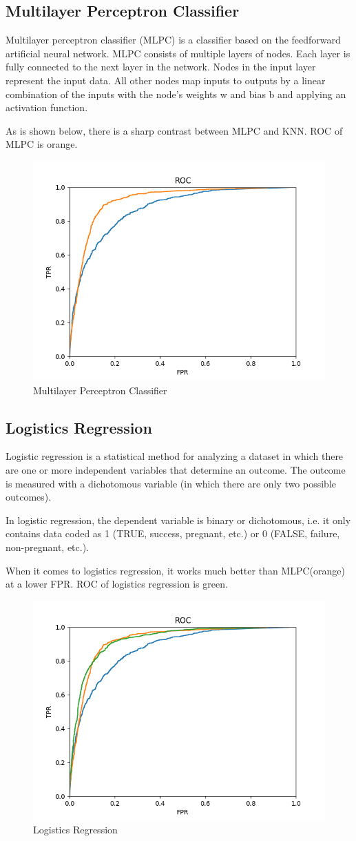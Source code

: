 \documentclass{article}
\begin{document}
\subsection{Multilayer Perceptron Classifier}
\quad Multilayer perceptron classifier (MLPC) is a classifier based on the feedforward artificial neural network. MLPC consists of multiple layers of nodes. Each layer is fully connected to the next layer in the network. Nodes in the input layer represent the input data. All other nodes map inputs to outputs by a linear combination of the inputs with the node’s weights w and bias b and applying an activation function. 

As is shown below, there is a sharp contrast between MLPC and KNN. ROC of MLPC is orange.

\begin{figure}[H]
\centering
\includegraphics[width=.4\textwidth]{MLP.png}
\caption{Multilayer Perceptron Classifier}
\end{figure}

\subsection{Logistics Regression}
\quad Logistic regression is a statistical method for analyzing a dataset in which there are one or more independent variables that determine an outcome. The outcome is measured with a dichotomous variable (in which there are only two possible outcomes).

In logistic regression, the dependent variable is binary or dichotomous, i.e. it only contains data coded as 1 (TRUE, success, pregnant, etc.) or 0 (FALSE, failure, non-pregnant, etc.).

When it comes to logistics regression, it works much better than MLPC(orange) at a lower FPR. ROC of logistics regression is green.


\begin{figure}[H]
\centering
\includegraphics[width=.4\textwidth]{LR.png}
\caption{Logistics Regression}
\end{figure}
\end{document}
